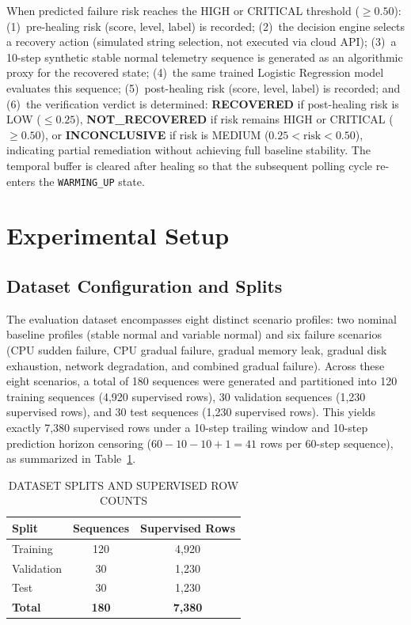 \documentclass[conference]{IEEEtran}
\begin{document}
When predicted failure risk reaches the HIGH or CRITICAL threshold ($\ge 0.50$): (1)~pre-healing risk (score, level, label) is recorded; (2)~the decision engine selects a recovery action (simulated string selection, not executed via cloud API); (3)~a 10-step synthetic stable normal telemetry sequence is generated as an algorithmic proxy for the recovered state; (4)~the same trained Logistic Regression model evaluates this sequence; (5)~post-healing risk (score, level, label) is recorded; and (6)~the verification verdict is determined: \textbf{RECOVERED} if post-healing risk is LOW ($\le 0.25$), \textbf{NOT\_RECOVERED} if risk remains HIGH or CRITICAL ($\ge 0.50$), or \textbf{INCONCLUSIVE} if risk is MEDIUM ($0.25 < \text{risk} < 0.50$), indicating partial remediation without achieving full baseline stability. The temporal buffer is cleared after healing so that the subsequent polling cycle re-enters the \texttt{WARMING\_UP} state.

\section{Experimental Setup}

\subsection{Dataset Configuration and Splits}

The evaluation dataset encompasses eight distinct scenario profiles: two nominal baseline profiles (stable normal and variable normal) and six failure scenarios (CPU sudden failure, CPU gradual failure, gradual memory leak, gradual disk exhaustion, network degradation, and combined gradual failure). Across these eight scenarios, a total of 180 sequences were generated and partitioned into 120 training sequences (4,920 supervised rows), 30 validation sequences (1,230 supervised rows), and 30 test sequences (1,230 supervised rows). This yields exactly 7,380 supervised rows under a 10-step trailing window and 10-step prediction horizon censoring ($60 - 10 - 10 + 1 = 41$ rows per 60-step sequence), as summarized in Table~\ref{tab:splits}.

\begin{table}[htbp]
\centering
\caption{DATASET SPLITS AND SUPERVISED ROW COUNTS}
\label{tab:splits}
\begin{tabular}{lcc}
\toprule
\textbf{Split} & \textbf{Sequences} & \textbf{Supervised Rows} \\
\midrule
Training & 120 & 4,920 \\
Validation & 30 & 1,230 \\
Test & 30 & 1,230 \\
\textbf{Total} & \textbf{180} & \textbf{7,380} \\
\bottomrule
\end{tabular}
\end{table}
\end{document}
